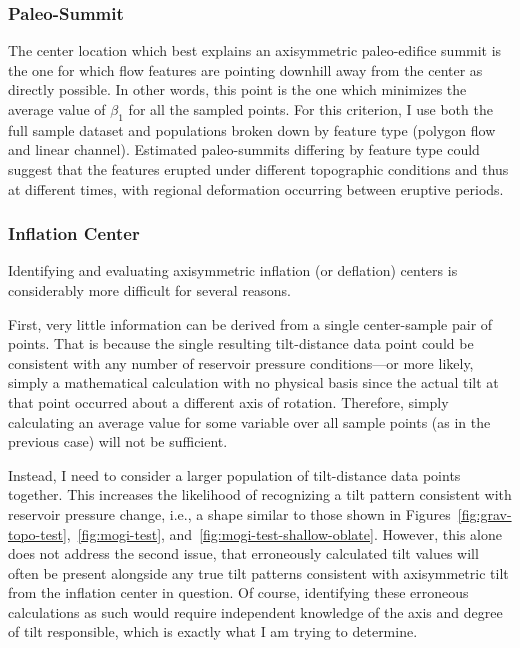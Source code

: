\subsubsection{Paleo-Summit}

The center location which best explains an axisymmetric paleo-edifice summit is the one for which flow features are pointing downhill away from the center as directly possible. In other words, this point is the one which minimizes the average value of $\beta_1$ for all the sampled points. For this criterion, I use both the full sample dataset and populations broken down by feature type (polygon flow and linear channel). Estimated paleo-summits differing by feature type could suggest that the features erupted under different topographic conditions and thus at different times, with regional deformation occurring between eruptive periods.

\subsubsection{Inflation Center}

Identifying and evaluating axisymmetric inflation (or deflation) centers is considerably more difficult for several reasons.

First, very little information can be derived from a single center-sample pair of points. That is because the single resulting tilt-distance data point could be consistent with any number of reservoir pressure conditions---or more likely, simply a mathematical calculation with no physical basis since the actual tilt at that point occurred about a different axis of rotation. Therefore, simply calculating an average value for some variable over all sample points (as in the previous case) will not be sufficient.

Instead, I need to consider a larger population of tilt-distance data points together. This increases the likelihood of recognizing a tilt pattern consistent with reservoir pressure change, i.e., a shape similar to those shown in Figures~\ref{fig:grav-topo-test},~\ref{fig:mogi-test}, and~\ref{fig:mogi-test-shallow-oblate}. However, this alone does not address the second issue, that erroneously calculated tilt values will often be present alongside any true tilt patterns consistent with axisymmetric tilt from the inflation center in question. Of course, identifying these erroneous calculations as such would require independent knowledge of the axis and degree of tilt responsible, which is exactly what I am trying to determine.

